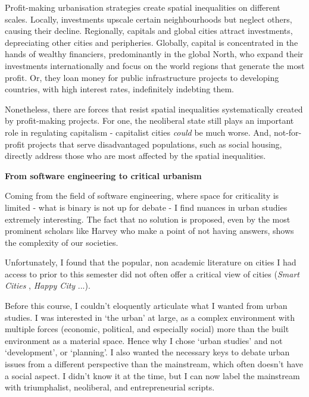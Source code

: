 \documentclass[12pt]{article}
\begin{document}
Profit-making urbanisation strategies create spatial inequalities on different scales. Locally, investments upscale certain neighbourhoods but neglect others, causing their decline. Regionally, capitals and global cities attract investments, depreciating other cities and peripheries. Globally, capital is concentrated in the hands of wealthy financiers, predominantly in the global North, who expand their investments internationally and focus on the world regions that generate the most profit. Or, they loan money for public infrastructure projects to developing countries, with high interest rates, indefinitely indebting them. 

Nonetheless, there are forces that resist spatial inequalities systematically created by profit-making projects. For one, the neoliberal state still plays an important role in regulating capitalism - capitalist cities \textit{could} be much worse. And, not-for-profit projects that serve disadvantaged populations, such as social housing, directly address those who are most affected by the spatial inequalities.

\pagebreak

\textbf{From software engineering to critical urbanism}

Coming from the field of software engineering, where space for criticality is limited - what is binary is not up for debate - I find nuances in urban studies extremely interesting. The fact that no solution is proposed, even by the most prominent scholars like Harvey who make a point of not having answers, shows the complexity of our societies. 

Unfortunately, I found that the popular, non academic literature on cities I had access to prior to this semester did not often offer a critical view of cities (\textit{Smart Cities} \parencite{townsend2013smart}, \textit{Happy City} \parencite{montgomery2013happy}...). 

Before this course, I couldn’t eloquently articulate what I wanted from urban studies. I was interested in `the urban’ at large, as a complex environment with multiple forces (economic, political, and especially social) more than the built environment as a material space. Hence why I chose ‘urban studies’ and not ‘development’, or ‘planning’.
I also wanted the necessary keys to debate urban issues from a different perspective than the mainstream, which often doesn’t have a social aspect. I didn’t know it at the time, but I can now label the mainstream with triumphalist, neoliberal, and entrepreneurial scripts.
\end{document}
